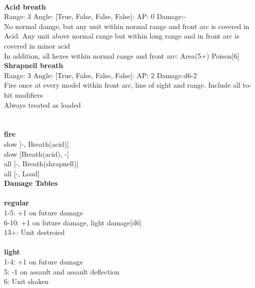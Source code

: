 \ \\
{\bf Acid breath } \\



Range: 3  Angle: [True, False, False, False]: AP: 0 Damage:- \\
No normal damge, but any unit within normal range and front arc is covered in Acid. Any unit above normal range but within long range and in front arc is covered in minor acid\\ 
In addition, all hexes within normal range and front arc: Area(5+) Poison[6]\\ 




{\bf Shrapnell breath } \\



Range: 3  Angle: [True, False, False, False]: AP: 2 Damage:d6-2 \\
Fire once at every model within front arc, line of sight and range. Include all to-hit modifiers\\ 
Always treated as loaded\\ 




 
\ \\



\ \\ {\bf fire } \\
slow [-, Breath(acid)] \\
slow [Breath(acid), -] \\
all [-, Breath(shrapnell)] \\
all [-, Load] \\


{\bf Damage Tables} \\
\ \\ {\bf regular } \\
1-5: +1 on future damage \\
6-10: +1 on future damage, light damage[d6] \\
13+: Unit destroied \\
\ \\ {\bf light } \\
1-4: +1 on future damage \\
5: -1 on assault and assault deflection \\
6: Unit shaken \\











